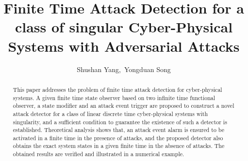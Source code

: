 \documentclass[english]{cccconf}
\theoremstyle{definition}
\begin{document}
\title{Finite Time Attack Detection for a class of singular Cyber-Physical Systems with Adversarial Attacks}
\author{Shushan Yang,\ Yongduan Song}
       




\maketitle

\begin{abstract}
This paper addresses the problem of finite time attack detection for cyber-physical systems. A given finite time state observer based on two infinite time functional observer, a state modifier and an attack event trigger are proposed  to construct a novel attack detector for a class of linear discrete time cyber-physical systems with singularity, and a sufficient condition to guarantee the existence of such a detector is established.  
Theoretical analysis shows that, an attack event alarm is ensured to be activated in a finite time in the presence of attacks, and the proposed detector also obtains the exact system states in a given finite time in the absence of attacks.
The obtained results are verified and illustrated in a numerical  example.
\end{abstract}

\end{document}
